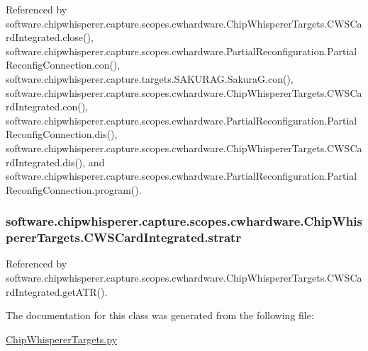Referenced by software.\+chipwhisperer.\+capture.\+scopes.\+cwhardware.\+Chip\+Whisperer\+Targets.\+C\+W\+S\+Card\+Integrated.\+close(), software.\+chipwhisperer.\+capture.\+scopes.\+cwhardware.\+Partial\+Reconfiguration.\+Partial\+Reconfig\+Connection.\+con(), software.\+chipwhisperer.\+capture.\+targets.\+S\+A\+K\+U\+R\+A\+G.\+Sakura\+G.\+con(), software.\+chipwhisperer.\+capture.\+scopes.\+cwhardware.\+Chip\+Whisperer\+Targets.\+C\+W\+S\+Card\+Integrated.\+con(), software.\+chipwhisperer.\+capture.\+scopes.\+cwhardware.\+Partial\+Reconfiguration.\+Partial\+Reconfig\+Connection.\+dis(), software.\+chipwhisperer.\+capture.\+scopes.\+cwhardware.\+Chip\+Whisperer\+Targets.\+C\+W\+S\+Card\+Integrated.\+dis(), and software.\+chipwhisperer.\+capture.\+scopes.\+cwhardware.\+Partial\+Reconfiguration.\+Partial\+Reconfig\+Connection.\+program().

\hypertarget{classsoftware_1_1chipwhisperer_1_1capture_1_1scopes_1_1cwhardware_1_1ChipWhispererTargets_1_1CWSCardIntegrated_a9ffd14c3d5aa3c00a4e9b67bc2a9097d}{}
\subsubsection[{stratr}]{\setlength{\rightskip}{0pt plus 5cm}software.\+chipwhisperer.\+capture.\+scopes.\+cwhardware.\+Chip\+Whisperer\+Targets.\+C\+W\+S\+Card\+Integrated.\+stratr}\label{classsoftware_1_1chipwhisperer_1_1capture_1_1scopes_1_1cwhardware_1_1ChipWhispererTargets_1_1CWSCardIntegrated_a9ffd14c3d5aa3c00a4e9b67bc2a9097d}


Referenced by software.\+chipwhisperer.\+capture.\+scopes.\+cwhardware.\+Chip\+Whisperer\+Targets.\+C\+W\+S\+Card\+Integrated.\+get\+A\+T\+R().



The documentation for this class was generated from the following file\+:\begin{DoxyCompactItemize}
\item 
\hyperlink{ChipWhispererTargets_8py}{Chip\+Whisperer\+Targets.\+py}\end{DoxyCompactItemize}
